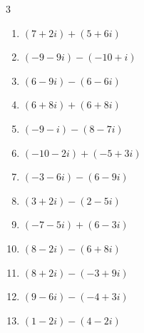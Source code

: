 \begin{multicols}{3}
\begin{enumerate}
        \phantom{$\displaystyle =-3+2i$}

  \item $\displaystyle (7+2i) + (5+6i)$

        \phantom{$\displaystyle =12+8i$}

  \item $\displaystyle (-9-9i) - (-10+i)$

        \phantom{$\displaystyle =1-10i$}

  \item $\displaystyle (6-9i) - (6-6i)$

        \phantom{$\displaystyle =-3i$}

  \item $\displaystyle (6+8i) + (6+8i)$

        \phantom{$\displaystyle =12+16i$}

  \item $\displaystyle (-9-i) - (8-7i)$

        \phantom{$\displaystyle =-17+6i$}

  \item $\displaystyle (-10-2i) + (-5+3i)$

        \phantom{$\displaystyle =-15+i$}

  \item $\displaystyle (-3-6i) - (6-9i)$

        \phantom{$\displaystyle =-9+3i$}

  \item $\displaystyle (3+2i) - (2-5i)$

        \phantom{$\displaystyle =1+7i$}

  \item $\displaystyle (-7-5i) + (6-3i)$

        \phantom{$\displaystyle =-1-8i$}

  \item $\displaystyle (8-2i) - (6+8i)$

        \phantom{$\displaystyle =2-10i$}

  \item $\displaystyle (8+2i) - (-3+9i)$

        \phantom{$\displaystyle =11-7i$}

\columnbreak %

  \item $\displaystyle (9-6i) - (-4+3i)$

        \phantom{$\displaystyle =13-9i$}

  \item $\displaystyle (1-2i) - (4-2i)$


\end{enumerate}
\end{multicols}
